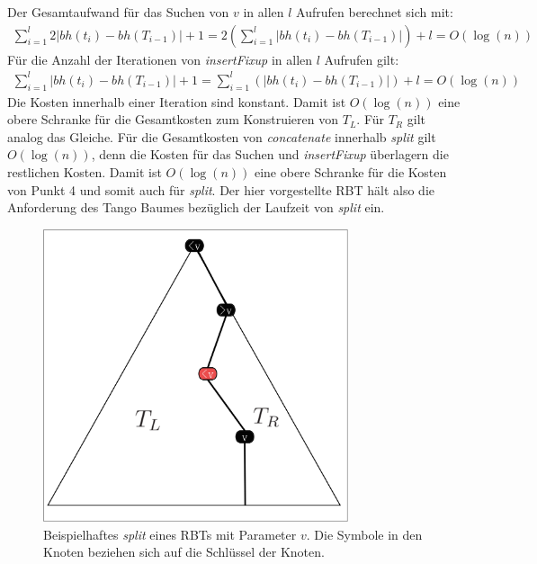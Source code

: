 \documentclass[a4paper,12pt]{article}
\begin{document}
\noindent Der Gesamtaufwand für das Suchen von $v$ in allen $l$ Aufrufen berechnet sich mit: 
\begin{align*}
\sum_{i = 1}^{l}  2 \vert\mathit{bh}(t_{i}) -\mathit{bh}(T_{i-1}) \vert + 1 =
2 \left( \sum_{i = 1}^{l}   \vert\mathit{bh}(t_{i}) -\mathit{bh}(T_{i-1}) \vert \right)+ l
= O \left(\log \left(n \right) \right)
\end{align*}
\noindent Für die Anzahl der Iterationen von \textit{insertFixup} in allen $l$ Aufrufen gilt: 
\begin{align*}
\sum_{i = 1}^{l}   \vert\mathit{bh}(t_{i}) -\mathit{bh}(T_{i-1}) \vert +1 =
\sum_{i = 1}^{l}  \left( \vert\mathit{bh}(t_{i}) -\mathit{bh}(T_{i-1}) \vert \right) + l 
= O \left(\log \left(n \right) \right)
\end{align*}
Die Kosten innerhalb einer Iteration sind konstant. Damit ist  $O \left(\log \left(n \right) \right)$ eine obere Schranke für die Gesamtkosten zum Konstruieren von $T_L$. Für $T_R$ gilt analog das Gleiche. Für die Gesamtkosten von \textit{concatenate} innerhalb \textit{split} gilt $O \left(\log \left(n \right) \right)$, denn die Kosten für das Suchen und \textit{insertFixup} überlagern die restlichen Kosten. Damit ist $O \left(\log \left(n \right) \right)$ eine obere Schranke für die Kosten von Punkt 4 und somit auch für \textit{split}. Der hier vorgestellte RBT hält also die Anforderung des Tango Baumes bezüglich der Laufzeit von \textit{split} ein.


\begin{figure}[H]
	\centering
	\includegraphics[width=0.8\textwidth]{Medien/RotSchwarzBaum/aufteilen}
	\caption{Beispielhaftes \textit{split} eines RBTs mit Parameter $v$. Die Symbole in den Knoten beziehen sich auf die Schlüssel der Knoten. }
	\label{fig:aufteilen}
\end{figure}
\end{document}
